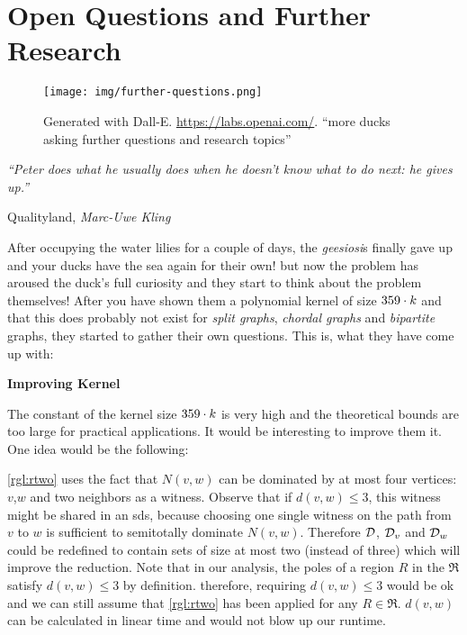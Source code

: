 \chapter{Open Questions and Further Research}\label{ch:closing}

\vspace*{-50pt}

\begin{figure}[ht]
        \texttt{[image: img/further-questions.png]}
        \captionsetup{textformat=empty,labelformat=blank}
        \caption[Generated with Dalle-E. Knowledge Cutoff 09-2022]{Generated with Dall-E. \url{https://labs.openai.com/}. ``more ducks asking further questions and research topics''}
\end{figure}

\epigraph{\itshape ``Peter does what he usually does when he doesn’t know what to do next: he gives up.''}{Qualityland, \textit{Marc-Uwe Kling}}

After occupying the water lilies for a couple of days, the \textit{geesiosi}s finally gave up and your ducks have the sea again for their own!
but now the problem has aroused the duck's full curiosity and they start to think about the problem themselves! 
After you have shown them a polynomial kernel of size $359 \cdot k$ and that this does probably not exist for \textit{split graphs}, \textit{chordal graphs} and \textit{bipartite} graphs, they started to gather their own questions.
This is, what they have come up with:


\noindent \textbf{Improving Kernel~}

The constant of the kernel size $359 \cdot k$ is very high and the theoretical bounds are too large for practical applications. 
It would be interesting to improve them it. 
One idea would be the following:

\cref{rgl:rtwo} uses the fact that $N(v,w)$ can be dominated by at most four vertices: $v$,$w$ and two neighbors as a witness.
Observe that if $d(v,w) \leq 3$, this witness might be shared in an sds, because choosing one single witness on the path from $v$ to $w$ is sufficient to semitotally dominate $N(v,w)$.
Therefore $\mathcal{D}$, $\mathcal{D}_{v}$ and $\mathcal{D}_{w}$ could be redefined to contain sets of size at most two (instead of three) which will improve the reduction. 
Note that in our analysis, the poles of a region $R$ in the \dreg $\mathfrak{R}$ satisfy $d(v,w) \leq 3$ by definition.
therefore, requiring $d(v,w) \leq 3$ would be ok and we can still assume that \cref{rgl:rtwo} has been applied for any $R \in \mathfrak{R}$.
$d(v,w)$ can be calculated in linear time and would not blow up our runtime.

